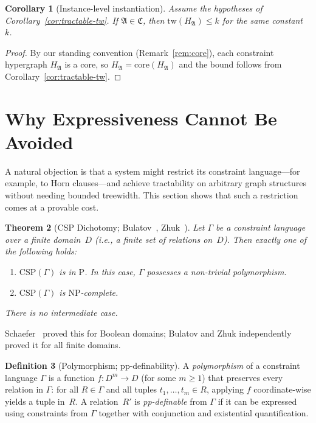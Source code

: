 \documentclass[11pt,a4paper]{article}
\theoremstyle{plain}
\newtheorem{theorem}{Theorem}[section]
\newtheorem{corollary}[theorem]{Corollary}
\theoremstyle{definition}
\newtheorem{definition}[theorem]{Definition}
\theoremstyle{remark}
\begin{document}
\begin{corollary}[Instance-level instantiation]\label{cor:tractable-tw-instance}
Assume the hypotheses of Corollary~\ref{cor:tractable-tw}.
If $\mathfrak{A} \in \mathfrak{C}$, then $\mathrm{tw}(H_{\mathfrak{A}}) \leq k$ for the same constant~$k$.
\end{corollary}

\begin{proof}
By our standing convention (Remark~\ref{rem:core}), each constraint hypergraph $H_{\mathfrak{A}}$ is a core, so $H_{\mathfrak{A}} = \mathrm{core}(H_{\mathfrak{A}})$ and the bound follows from Corollary~\ref{cor:tractable-tw}.
\end{proof}

\section{Why Expressiveness Cannot Be Avoided}\label{sec:expressiveness}

A natural objection is that a system might restrict its constraint language---for example, to Horn clauses---and achieve tractability on arbitrary graph structures without needing bounded treewidth.
This section shows that such a restriction comes at a provable cost.

\begin{theorem}[CSP Dichotomy; Bulatov~\cite{Bulatov17}, Zhuk~\cite{Zhuk20}]\label{thm:dichotomy}
Let $\Gamma$ be a constraint language over a finite domain~$D$ (i.e., a finite set of relations on~$D$).
Then exactly one of the following holds:
\begin{enumerate}[nosep,label=(\roman*)]
  \item\label{di:tractable} $\mathrm{CSP}(\Gamma)$ is in $\mathrm{P}$.
  In this case, $\Gamma$ possesses a non-trivial polymorphism.
  \item\label{di:hard} $\mathrm{CSP}(\Gamma)$ is $\mathrm{NP}$-complete.
\end{enumerate}
There is no intermediate case.
\end{theorem}

Schaefer~\cite{Schaefer78} proved this for Boolean domains; Bulatov and Zhuk independently proved it for all finite domains.

\begin{definition}[Polymorphism; pp-definability]\label{def:polymorphism}
A \emph{polymorphism} of a constraint language $\Gamma$ is a function $f\colon D^m \to D$ (for some $m \geq 1$) that preserves every relation in $\Gamma$: for all $R \in \Gamma$ and all tuples $t_1, \ldots, t_m \in R$, applying $f$ coordinate-wise yields a tuple in~$R$.
A relation~$R'$ is \emph{pp-definable} from $\Gamma$ if it can be expressed using constraints from $\Gamma$ together with conjunction and existential quantification.
\end{definition}
\end{document}
